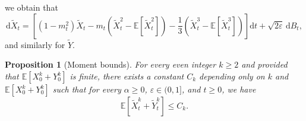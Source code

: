 \documentclass[11pt]{amsart}
\newtheorem{proposition}{Proposition}
\theoremstyle{remark}
\theoremstyle{definition}
\numberwithin{equation}{section}
\numberwithin{proposition}{section}
\newcommand{\ep}{\varepsilon}
\renewcommand{\le}{\leqslant}
\renewcommand{\ge}{\geqslant}
\newcommand{\td}{\widetilde}
\newcommand{\Ll}{\left}
\newcommand{\Rr}{\right}
\renewcommand{\d}{\mathrm{d}}
\newcommand{\1}{\mathbf{1}}
\newcommand{\al}{\alpha}
\newcommand{\E}{\mathbb E}
\begin{document}
we obtain that
\begin{equation}
\label{e.SDE.for.td}
\d \td X_t = \Ll[(1-m_t^2)\td X_t - m_t \Ll( \td X_t^2 - \E[\td X_t^2] \Rr) - \frac 1 3 \Ll( \td X_t^3 - \E[\td X_t^3] \Rr) \Rr]  \d t + \sqrt{2\ep} \, \d B_t,
\end{equation}
and similarly for $\td Y$. 
\begin{proposition}[Moment bounds]
\label{p.moment.bounds} 
For every even integer $k \ge 2$ and provided that $\E[X_0^k + Y_0^k]$ is finite, there exists a constant $C_k$ depending only on $k$ and $\E[X_0^k + Y_0^k]$ such that for every $\al \ge 0$, $\ep \in (0,1]$, and $t \ge 0$, we have
\begin{equation*}  %
\E[\td X_t^k + \td Y_t^k] \le C_k.
\end{equation*}
\end{proposition}
\end{document}
